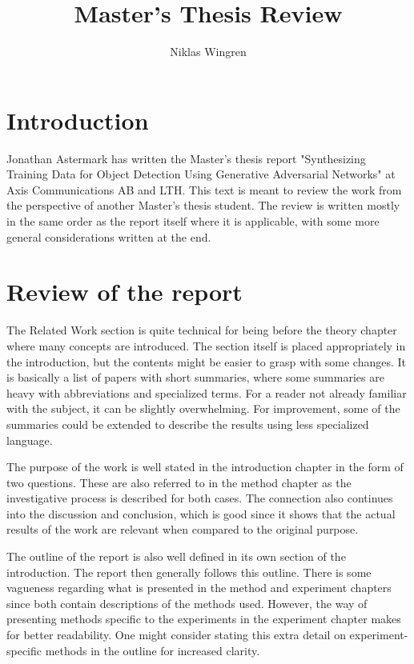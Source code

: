 \documentclass[11pt,a4paper]{article}
\author{Niklas Wingren}
\title{Master's Thesis Review}
\begin{document}
	\maketitle
	
	\section*{Introduction}
	Jonathan Astermark has written the Master's thesis report "Synthesizing Training Data for Object Detection Using Generative Adversarial Networks" at Axis Communications AB and LTH. This text is meant to review the work from the perspective of another Master's thesis student. The review is written mostly in the same order as the report itself where it is applicable, with some more general considerations written at the end.
	
	\section*{Review of the report}
	The Related Work section is quite technical for being before the theory chapter where many concepts are introduced. The section itself is placed appropriately in the introduction, but the contents might be easier to grasp with some changes. It is basically a list of papers with short summaries, where some summaries are heavy with abbreviations and specialized terms. For a reader not already familiar with the subject, it can be slightly overwhelming. For improvement, some of the summaries could be extended to describe the results using less specialized language.
	
	The purpose of the work is well stated in the introduction chapter in the form of two questions. These are also referred to in the method chapter as the investigative process is described for both cases. The connection also continues into the discussion and conclusion, which is good since it shows that the actual results of the work are relevant when compared to the original purpose.
	
	The outline of the report is also well defined in its own section of the introduction. The report then generally follows this outline. There is some vagueness regarding what is presented in the method and experiment chapters since both contain descriptions of the methods used. However, the way of presenting methods specific to the experiments in the experiment chapter makes for better readability. One might consider stating this extra detail on experiment-specific methods in the outline for increased clarity.
	
\end{document}
